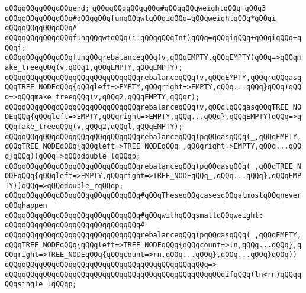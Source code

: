 \verb|qQQqqQQqqQQqqQQqend;|\newline
\newline
\verb|qQQqqQQqqQQqqQQq#qQQqqQQqweightqQQq=qQQq3|\newline
\verb|qQQqqQQqqQQqqQQq#qQQqqQQqfunqQQqwtqQQqiqQQq=qQQqweightqQQq*qQQqi|\newline
\verb|qQQqqQQqqQQqqQQq#|\newline
\verb|qQQqqQQqqQQqqQQqfunqQQqwtqQQq(i:qQQqqQQqInt)qQQq=qQQqiqQQq+qQQqiqQQq+qQQqi;|\newline
\newline
\verb|qQQqqQQqqQQqqQQqfunqQQqrebalanceqQQq(v,qQQqEMPTY,qQQqEMPTY)qQQq=>qQQqmake_treeqQQq(v,qQQq1,qQQqEMPTY,qQQqEMPTY);|\newline
\verb|qQQqqQQqqQQqqQQqqQQqqQQqqQQqqQQqrebalanceqQQq(v,qQQqEMPTY,qQQqrqQQqasqQQqTREE_NODEqQQq{qQQqleft=>EMPTY,qQQqright=>EMPTY,qQQq...qQQq}qQQq)qQQq=>qQQqmake_treeqQQq(v,qQQq2,qQQqEMPTY,qQQqr);|\newline
\verb|qQQqqQQqqQQqqQQqqQQqqQQqqQQqqQQqrebalanceqQQq(v,qQQqlqQQqasqQQqTREE_NODEqQQq{qQQqleft=>EMPTY,qQQqright=>EMPTY,qQQq...qQQq},qQQqEMPTY)qQQq=>qQQqmake_treeqQQq(v,qQQq2,qQQql,qQQqEMPTY);|\newline
\newline
\verb|qQQqqQQqqQQqqQQqqQQqqQQqqQQqqQQqrebalanceqQQq(pqQQqasqQQq(_,qQQqEMPTY,qQQqTREE_NODEqQQq{qQQqleft=>TREE_NODEqQQq_,qQQqright=>EMPTY,qQQq...qQQq}qQQq))qQQq=>qQQqdouble_lqQQqp;|\newline
\verb|qQQqqQQqqQQqqQQqqQQqqQQqqQQqqQQqrebalanceqQQq(pqQQqasqQQq(_,qQQqTREE_NODEqQQq{qQQqleft=>EMPTY,qQQqright=>TREE_NODEqQQq_,qQQq...qQQq},qQQqEMPTY))qQQq=>qQQqdouble_rqQQqp;|\newline
\newline
\verb|qQQqqQQqqQQqqQQqqQQqqQQqqQQqqQQq#qQQqTheseqQQqcasesqQQqalmostqQQqneverqQQqhappen|\newline
\verb|qQQqqQQqqQQqqQQqqQQqqQQqqQQqqQQq#qQQqwithqQQqsmallqQQqweight:|\newline
\verb|qQQqqQQqqQQqqQQqqQQqqQQqqQQqqQQq#|\newline
\verb|qQQqqQQqqQQqqQQqqQQqqQQqqQQqqQQqrebalanceqQQq(pqQQqasqQQq(_,qQQqEMPTY,qQQqTREE_NODEqQQq{qQQqleft=>TREE_NODEqQQq{qQQqcount=>ln,qQQq...qQQq},qQQqright=>TREE_NODEqQQq{qQQqcount=>rn,qQQq...qQQq},qQQq...qQQq}qQQq))|\newline
\verb|qQQqqQQqqQQqqQQqqQQqqQQqqQQqqQQqqQQqqQQqqQQqqQQq=>|\newline
\verb|qQQqqQQqqQQqqQQqqQQqqQQqqQQqqQQqqQQqqQQqqQQqqQQqqQQqifqQQq(ln<rn)qQQqqQQqsingle_lqQQqp;|\newline
